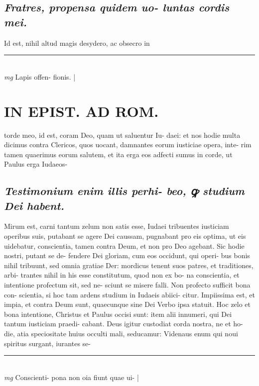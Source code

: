 \documentclass{article}
\begin{document}
\begin{pages}
\subsection*{\textit{Fratres, propensa quidem uo- luntas cordis mei. }}\pstart Id est, nihil altud magis desydero, ac obsecro in  \pend\pstart \huge\textbf{}\normalsize  \pend
\vspace{0.5cm}\noindent
\vspace{0.2cm}\rule{1cm}{0.2pt}\\ 
\hspace{0.2cm}\textit{mg}
\footnotesize Lapis offen- fionis. 
\normalsize| 
\section*{IN EPIST. AD ROM.  }
\marginpar{[ p.117 ]}\pstart torde meo, id est, coram Deo, quam ut saluentur Iu- daei: et nos hodie multa dicimus contra Clericos, quos uocant, damnantes eorum iusticiae opera, inte- rim tamen quaerimus eorum salutem, et ita erga eos adfecti sumus in corde, ut Paulus erga Iudaeos-  \pend
{}
{}
\subsection*{\textit{Testimonium enim illis perhi- beo, ꝙ studium Dei habent. }}\pstart Mirum est, carni tantum zelum non satis esse, Iudaei tribuentes iusticiam operibus suis, putabant se agere Dei caussam, pugnabant pro eis optima, ut eis uidebatur, conscientia, tamen contra Deum, et non pro Deo agebant. Sic hodie nostri, putant se de- fendere Dei gloriam, cum eos occidunt, qui operi- bus bonis nihil tribuunt, sed omnia gratiae Der: mordicus tenent suos patres, et traditiones, arbi- trantes nihil in his esse constitutum, quod non ex bo- na conscientia, et intentione profectum sit, sed ne- sciunt se misere falli. Non profecto sufficit bona con- scientia, si hoc tam ardens studium in Iudaeis abiici- citur. Impiissima est, et impia, et contra Deum sunt, quaecunque sine Dei Verbo ipsa statuit. Hoc zelo et bona intentione, Christus et Paulus occisi sunt: item alii innumeri, qui Dei tantum iusticiam praedi- cabant. Deus igitur custodiat corda nostra, ne et ho- die, atia speciositate huius occulti mali, seducamur: Videnaus enum qui noui spiritus surgant, iurantes se-  \pend
\vspace{0.5cm}\noindent
\vspace{0.2cm}\rule{1cm}{0.2pt}\\ 
\hspace{0.2cm}\textit{mg}
\footnotesize Conscienti- pona non oia fiunt quae ui- 
\normalsize| 

\end{pages}
\end{document}
